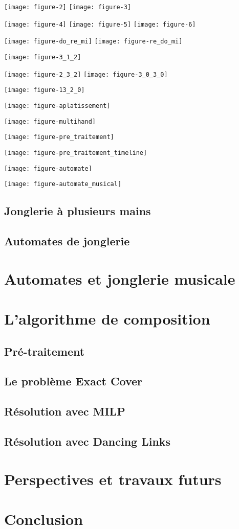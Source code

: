 \documentclass[a4paper]{easychair}
\begin{document}
\texttt{[image: figure-2]}
\texttt{[image: figure-3]}

\texttt{[image: figure-4]}
\texttt{[image: figure-5]}
\texttt{[image: figure-6]}

\texttt{[image: figure-do\_re\_mi]}
\texttt{[image: figure-re\_do\_mi]}

\texttt{[image: figure-3\_1\_2]}

\texttt{[image: figure-2\_3\_2]}
\texttt{[image: figure-3\_0\_3\_0]}

\texttt{[image: figure-13\_2\_0]}

\texttt{[image: figure-aplatissement]}

\texttt{[image: figure-multihand]}

\texttt{[image: figure-pre\_traitement]}

\texttt{[image: figure-pre\_traitement\_timeline]}

\texttt{[image: figure-automate]}

\texttt{[image: figure-automate\_musical]}

\subsection{Jonglerie à plusieurs mains}

\subsection{Automates de jonglerie}



\section{Automates et jonglerie musicale}

\section{L'algorithme de composition}
\subsection{Pré-traitement}
\subsection{Le problème Exact Cover}
\subsection{Résolution avec MILP}
\subsection{Résolution avec Dancing Links}

\section{Perspectives et travaux futurs}

\section{Conclusion}
\label{sec:conclusion}



\end{document}
